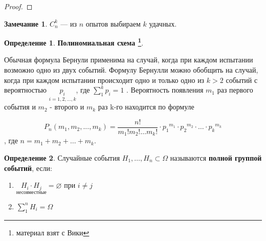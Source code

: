 \documentclass[a4paper, 12pt]{article}
\theoremstyle{definition}
\newtheorem{Definition}{Определение}
\newtheorem{Note}{Замечание}
\begin{document}
    \begin{proof}
        \leavevmode
    \end{proof}

    \begin{Note}
        \(C^{k}_{n}\) --- из \(n\) опытов выбираем \(k\) удачных.
    \end{Note}

    \begin{Definition}
        \textbf{Полиномиальная схема \footnote{материал взят с Вики}}.

        Обычная формула Бернули применима на случай, когда при каждом испытании возможно одно из двух событий. Формулу Бернулли
        можно обобщить на случай, когда при каждом испытании происходит одно и только одно из  \(k > 2\)  событий с вероятностью
        \(\underset{i = 1, 2, \ldots, k}{p_i}\), где \(\sum^{k}_{1} p_i = 1\) . Вероятность появления  \(m_1\)  раз первого события
        и  \(m_2\)  - второго и  \(m_k\)  раз k-го находится по формуле

        \[P_n(m_1,m_2,...,m_k)= \frac{n!}{m_1! m_2! \ldots m_k!} \cdot {p_1}^{m_1} \cdot {p_2}^{m_2} \cdot \ldots \cdot {p_k}^{m_k}\]
        , где  \(n = m_1 + m_2 + \ldots +m_k\). 
    \end{Definition}

    \begin{Definition}
        Случайные события \(H_1, \ldots, H_n \subset \Omega\) называются \textbf{полной группой событий}, если:
            \begin{enumerate}
                \item
                    \(\underset{\text{несовместные}}{H_i \cdot H_j} = \varnothing\) при \(i \neq j\)
                \item
                    \(\sum^{n}_{1} H_i = \Omega\)
            \end{enumerate}
    \end{Definition}
\end{document}
